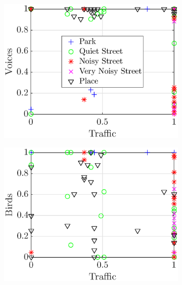 \documentclass[twocolumn]{article}
\begin{document}
\begin{figure}[th]
    \centering
     \begin{subfigure}[t]{0.33\textwidth}
        \centering
        \includegraphics[width=\textwidth]{figures/tv_pres.eps}
    \end{subfigure}%
    \begin{subfigure}[t]{0.33\textwidth}
        \centering
        \includegraphics[width=\textwidth]{figures/tb_pres.eps}
    \end{subfigure}
    \begin{subfigure}[t]{0.33\textwidth}
        \centering

\end{subfigure}
\end{figure}
\end{document}
